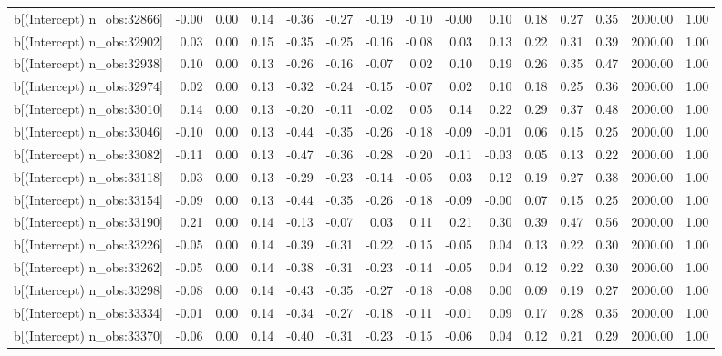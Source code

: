 \begin{table}[ht]
\begin{tabular}{rrrrrrrrrrrrrrr}
  b[(Intercept) n\_obs:32866] & -0.00 & 0.00 & 0.14 & -0.36 & -0.27 & -0.19 & -0.10 & -0.00 & 0.10 & 0.18 & 0.27 & 0.35 & 2000.00 & 1.00 \\ 
  b[(Intercept) n\_obs:32902] & 0.03 & 0.00 & 0.15 & -0.35 & -0.25 & -0.16 & -0.08 & 0.03 & 0.13 & 0.22 & 0.31 & 0.39 & 2000.00 & 1.00 \\ 
  b[(Intercept) n\_obs:32938] & 0.10 & 0.00 & 0.13 & -0.26 & -0.16 & -0.07 & 0.02 & 0.10 & 0.19 & 0.26 & 0.35 & 0.47 & 2000.00 & 1.00 \\ 
  b[(Intercept) n\_obs:32974] & 0.02 & 0.00 & 0.13 & -0.32 & -0.24 & -0.15 & -0.07 & 0.02 & 0.10 & 0.18 & 0.25 & 0.36 & 2000.00 & 1.00 \\ 
  b[(Intercept) n\_obs:33010] & 0.14 & 0.00 & 0.13 & -0.20 & -0.11 & -0.02 & 0.05 & 0.14 & 0.22 & 0.29 & 0.37 & 0.48 & 2000.00 & 1.00 \\ 
  b[(Intercept) n\_obs:33046] & -0.10 & 0.00 & 0.13 & -0.44 & -0.35 & -0.26 & -0.18 & -0.09 & -0.01 & 0.06 & 0.15 & 0.25 & 2000.00 & 1.00 \\ 
  b[(Intercept) n\_obs:33082] & -0.11 & 0.00 & 0.13 & -0.47 & -0.36 & -0.28 & -0.20 & -0.11 & -0.03 & 0.05 & 0.13 & 0.22 & 2000.00 & 1.00 \\ 
  b[(Intercept) n\_obs:33118] & 0.03 & 0.00 & 0.13 & -0.29 & -0.23 & -0.14 & -0.05 & 0.03 & 0.12 & 0.19 & 0.27 & 0.38 & 2000.00 & 1.00 \\ 
  b[(Intercept) n\_obs:33154] & -0.09 & 0.00 & 0.13 & -0.44 & -0.35 & -0.26 & -0.18 & -0.09 & -0.00 & 0.07 & 0.15 & 0.25 & 2000.00 & 1.00 \\ 
  b[(Intercept) n\_obs:33190] & 0.21 & 0.00 & 0.14 & -0.13 & -0.07 & 0.03 & 0.11 & 0.21 & 0.30 & 0.39 & 0.47 & 0.56 & 2000.00 & 1.00 \\ 
  b[(Intercept) n\_obs:33226] & -0.05 & 0.00 & 0.14 & -0.39 & -0.31 & -0.22 & -0.15 & -0.05 & 0.04 & 0.13 & 0.22 & 0.30 & 2000.00 & 1.00 \\ 
  b[(Intercept) n\_obs:33262] & -0.05 & 0.00 & 0.14 & -0.38 & -0.31 & -0.23 & -0.14 & -0.05 & 0.04 & 0.12 & 0.22 & 0.30 & 2000.00 & 1.00 \\ 
  b[(Intercept) n\_obs:33298] & -0.08 & 0.00 & 0.14 & -0.43 & -0.35 & -0.27 & -0.18 & -0.08 & 0.00 & 0.09 & 0.19 & 0.27 & 2000.00 & 1.00 \\ 
  b[(Intercept) n\_obs:33334] & -0.01 & 0.00 & 0.14 & -0.34 & -0.27 & -0.18 & -0.11 & -0.01 & 0.09 & 0.17 & 0.28 & 0.35 & 2000.00 & 1.00 \\ 
  b[(Intercept) n\_obs:33370] & -0.06 & 0.00 & 0.14 & -0.40 & -0.31 & -0.23 & -0.15 & -0.06 & 0.04 & 0.12 & 0.21 & 0.29 & 2000.00 & 1.00 \\ 

\end{tabular}
\end{table}
